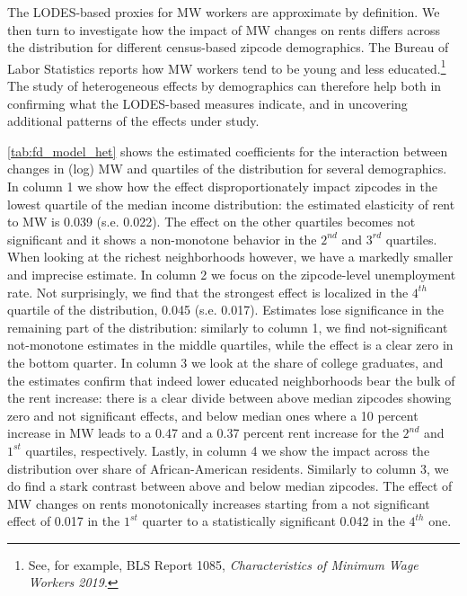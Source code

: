 The LODES-based proxies for MW workers are approximate by definition. We then turn to investigate 
how the impact of MW changes on rents differs across the distribution for different census-based 
zipcode demographics. The Bureau of Labor Statistics reports how MW workers tend to be young and 
less educated.\footnote{See, for example, BLS Report 1085, \textit{Characteristics of Minimum Wage 
		Workers 2019}.} %
The study of heterogeneous effects by demographics can therefore help both in confirming what the
LODES-based measures indicate, and in uncovering additional patterns of the effects under study.

\autoref{tab:fd_model_het} shows the estimated coefficients for the interaction between changes in 
(log) MW and quartiles of the distribution for several demographics. In column 1 we show how the 
effect disproportionately impact zipcodes in the lowest quartile of the median income distribution: 
the estimated elasticity of rent to MW is 0.039 (s.e. 0.022). The effect on the other quartiles 
becomes not significant and it shows a non-monotone behavior in the $2^{nd}$ and $3^{rd}$ quartiles. 
When looking at the richest neighborhoods however, we have a markedly smaller and imprecise estimate. 
In column 2 we focus on the zipcode-level unemployment  rate. Not surprisingly, we find that the 
strongest effect is localized in the $4^{th}$ quartile of the distribution, 0.045 (s.e. 0.017). 
Estimates lose significance in the remaining part of the distribution: similarly to column 1, we 
find not-significant not-monotone estimates in the middle quartiles, while the effect is a clear 
zero in the bottom quarter. In column 3 we look at the share of college graduates, and the estimates 
confirm that indeed lower educated neighborhoods bear the bulk of the rent increase: there is a 
clear divide between above median zipcodes showing zero and not significant effects, and below 
median ones where a 10 percent increase in MW leads to a 0.47 and a 0.37 percent rent increase for 
the $2^{nd}$ and $1^{st}$ quartiles, respectively. Lastly, in column 4 we show the impact across 
the distribution over share of African-American residents. Similarly to column 3, we do find a 
stark contrast between above and below median zipcodes. The effect of MW changes on rents 
monotonically increases starting from a not significant effect of 0.017 in the $1^{st}$ quarter to 
a statistically significant 0.042 in the $4^{th}$ one.

